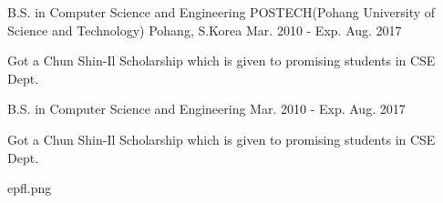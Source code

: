 

\begin{cventries}

  \cventry
    {B.S. in Computer Science and Engineering} %
    {POSTECH(Pohang University of Science and Technology)} %
    {Pohang, S.Korea} %
    {Mar. 2010 - Exp. Aug. 2017} %
    {
      \begin{cvitems} %
        \item {Got a Chun Shin-Il Scholarship which is given to promising students in CSE Dept.}
      \end{cvitems}
    }

    \cventrylogo
      {B.S. in Computer Science and Engineering} %
      {} %
      {} %
      {Mar. 2010 - Exp. Aug. 2017} %
      {
        \begin{cvitems} %
          \item {Got a Chun Shin-Il Scholarship which is given to promising students in CSE Dept.}
        \end{cvitems}
      }
      {epfl.png}

\end{cventries}
